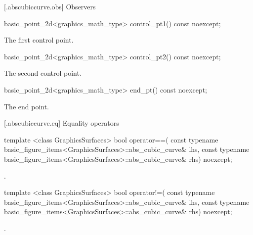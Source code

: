  [\iotwod.abscubiccurve.obs] {Observers}

%
\begin{itemdecl}
basic_point_2d<graphics_math_type> control_pt1() const noexcept;
\end{itemdecl}
\begin{itemdescr}
\pnum
\returns The first control point.
\end{itemdescr}

%
\begin{itemdecl}
basic_point_2d<graphics_math_type> control_pt2() const noexcept;
\end{itemdecl}
\begin{itemdescr}
\pnum
\returns The second control point.
\end{itemdescr}

%
\begin{itemdecl}
basic_point_2d<graphics_math_type> end_pt() const noexcept;
\end{itemdecl}
\begin{itemdescr}
\pnum
\returns The end point.
\end{itemdescr}

 [\iotwod.abscubiccurve.eq] {Equality operators}%

%
\begin{itemdecl}
template <class GraphicsSurfaces>
bool operator==(
  const typename basic_figure_items<GraphicsSurfaces>::abs_cubic_curve& lhs,
  const typename basic_figure_items<GraphicsSurfaces>::abs_cubic_curve& rhs) 
  noexcept;
\end{itemdecl}
\begin{itemdescr}
\pnum
\returns
{}.
\end{itemdescr}

%
\begin{itemdecl}
template <class GraphicsSurfaces>
bool operator!=(
  const typename basic_figure_items<GraphicsSurfaces>::abs_cubic_curve& lhs,
  const typename basic_figure_items<GraphicsSurfaces>::abs_cubic_curve& rhs) 
  noexcept;
\end{itemdecl}
\begin{itemdescr}
\pnum
\returns
{}.
\end{itemdescr}
